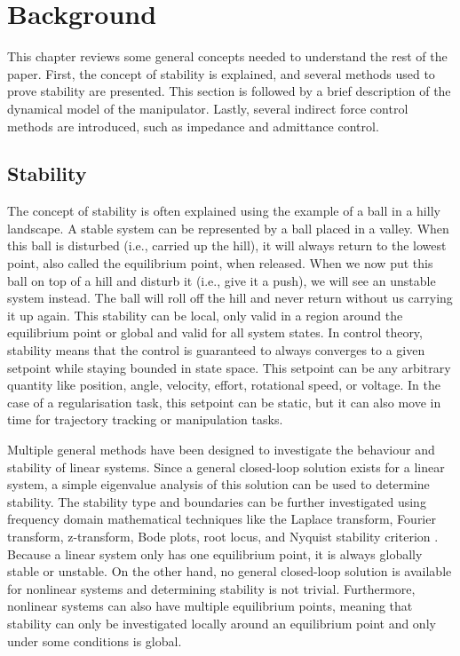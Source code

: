 \chapter{Background}
\label{chapter:background}

This chapter reviews some general concepts needed to understand the rest of the paper. First, the concept of stability is explained, and several methods used to prove stability are presented. This section is followed by a brief description of the dynamical model of the manipulator. Lastly, several indirect force control methods are introduced, such as impedance and admittance control.

\section{Stability}

The concept of stability is often explained using the example of a ball in a hilly landscape. A stable system can be represented by a ball placed in a valley. When this ball is disturbed (i.e., carried up the hill), it will always return to the lowest point, also called the equilibrium point, when released. When we now put this ball on top of a hill and disturb it (i.e., give it a push), we will see an unstable system instead. The ball will roll off the hill and never return without us carrying it up again. This stability can be local, only valid in a region around the equilibrium point or global and valid for all system states. In control theory, stability means that the control is guaranteed to always converges to a given setpoint while staying bounded in state space. This setpoint can be any arbitrary quantity like position, angle, velocity, effort, rotational speed, or voltage. In the case of a regularisation task, this setpoint can be static, but it can also move in time for trajectory tracking or manipulation tasks.

Multiple general methods have been designed to investigate the behaviour and stability of linear systems. Since a general closed-loop solution exists for a linear system, a simple eigenvalue analysis of this solution can be used to determine stability. The stability type and boundaries can be further investigated using frequency domain mathematical techniques like the Laplace transform, Fourier transform, z-transform, Bode plots, root locus, and Nyquist stability criterion \cite{bacciottiStabilityControlLinear2019}. Because a linear system only has one equilibrium point, it is always globally stable or unstable. On the other hand, no general closed-loop solution is available for nonlinear systems and determining stability is not trivial. Furthermore, nonlinear systems can also have multiple equilibrium points, meaning that stability can only be investigated locally around an equilibrium point and only under some conditions is global.

